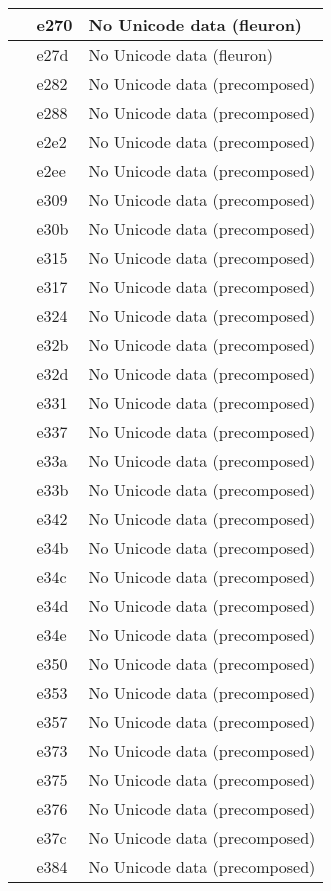 \documentclass[12pt,letterpaper,openany]{book}
\begin{document}
\begin{center}
\begin{supertabular}{|m{0.25in}|m{0.5in}|m{4in}|}
 & e270 & No Unicode data (fleuron)\\\hline
 & e27d & No Unicode data (fleuron)\\\hline
 & e282 & No Unicode data (precomposed)\\\hline
 & e288 & No Unicode data (precomposed)\\\hline
 & e2e2 & No Unicode data (precomposed)\\\hline
 & e2ee & No Unicode data (precomposed)\\\hline
 & e309 & No Unicode data (precomposed)\\\hline
 & e30b & No Unicode data (precomposed)\\\hline
 & e315 & No Unicode data (precomposed)\\\hline
 & e317 & No Unicode data (precomposed)\\\hline
 & e324 & No Unicode data (precomposed)\\\hline
 & e32b & No Unicode data (precomposed)\\\hline
 & e32d & No Unicode data (precomposed)\\\hline
 & e331 & No Unicode data (precomposed)\\\hline
 & e337 & No Unicode data (precomposed)\\\hline
 & e33a & No Unicode data (precomposed)\\\hline
 & e33b & No Unicode data (precomposed)\\\hline
 & e342 & No Unicode data (precomposed)\\\hline
 & e34b & No Unicode data (precomposed)\\\hline
 & e34c & No Unicode data (precomposed)\\\hline
 & e34d & No Unicode data (precomposed)\\\hline
 & e34e & No Unicode data (precomposed)\\\hline
 & e350 & No Unicode data (precomposed)\\\hline
 & e353 & No Unicode data (precomposed)\\\hline
 & e357 & No Unicode data (precomposed)\\\hline
 & e373 & No Unicode data (precomposed)\\\hline
 & e375 & No Unicode data (precomposed)\\\hline
 & e376 & No Unicode data (precomposed)\\\hline
 & e37c & No Unicode data (precomposed)\\\hline
 & e384 & No Unicode data (precomposed)\\\hline

\end{supertabular}
\end{center}
\end{document}

